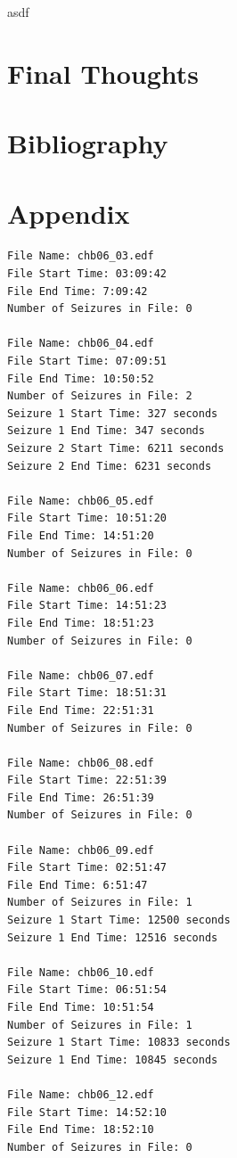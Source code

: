 \documentclass[12pt]{article}
\begin{document}
asdf


\section{Final Thoughts}

\cite{test}



\pagebreak
\section{Bibliography}


\pagebreak
\section{Appendix}

\begin{lstlisting}[style=logstyle, caption={Example Summary file from the \acrshort{chb} \acrshort{eeg} dataset.}, label={lst:summary-file}]
File Name: chb06_03.edf
File Start Time: 03:09:42
File End Time: 7:09:42
Number of Seizures in File: 0

File Name: chb06_04.edf
File Start Time: 07:09:51
File End Time: 10:50:52
Number of Seizures in File: 2
Seizure 1 Start Time: 327 seconds
Seizure 1 End Time: 347 seconds
Seizure 2 Start Time: 6211 seconds
Seizure 2 End Time: 6231 seconds

File Name: chb06_05.edf
File Start Time: 10:51:20
File End Time: 14:51:20
Number of Seizures in File: 0

File Name: chb06_06.edf
File Start Time: 14:51:23
File End Time: 18:51:23
Number of Seizures in File: 0

File Name: chb06_07.edf
File Start Time: 18:51:31
File End Time: 22:51:31
Number of Seizures in File: 0

File Name: chb06_08.edf
File Start Time: 22:51:39
File End Time: 26:51:39
Number of Seizures in File: 0

File Name: chb06_09.edf
File Start Time: 02:51:47
File End Time: 6:51:47
Number of Seizures in File: 1
Seizure 1 Start Time: 12500 seconds
Seizure 1 End Time: 12516 seconds

File Name: chb06_10.edf
File Start Time: 06:51:54
File End Time: 10:51:54
Number of Seizures in File: 1
Seizure 1 Start Time: 10833 seconds
Seizure 1 End Time: 10845 seconds

File Name: chb06_12.edf
File Start Time: 14:52:10
File End Time: 18:52:10
Number of Seizures in File: 0


\end{lstlisting}
\end{document}
